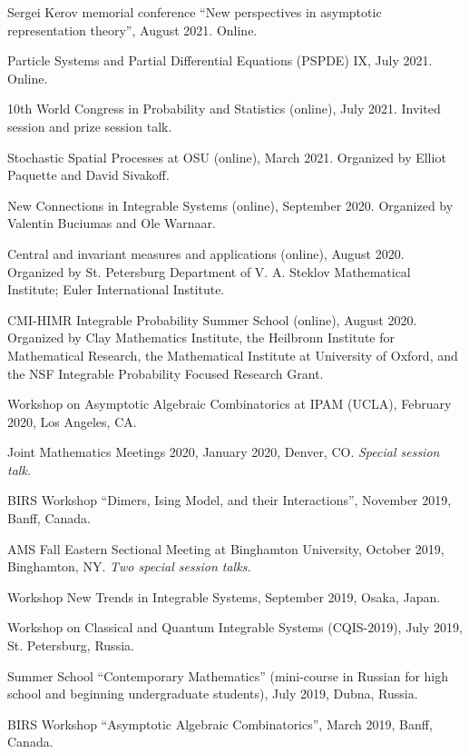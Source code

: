 \documentclass[letterpaper,11pt]{article}
\begin{document}
\begin{etaremune}
\item
	Sergei Kerov memorial conference
	``New perspectives in asymptotic representation theory'',
	August 2021. Online.
\item 
	Particle Systems and Partial Differential Equations (PSPDE) IX,
	July 2021. Online.
\item 
	10th World Congress in Probability and Statistics (online),
	July 2021.
	Invited session and prize session talk. 
\item
	Stochastic Spatial Processes at OSU (online),
	March 2021. 
	Organized by Elliot Paquette and David Sivakoff.
\item New Connections in Integrable Systems (online),
	September 2020. 
	Organized by Valentin Buciumas and Ole Warnaar.
\item
	Central and invariant measures and applications (online),
	August 2020.
	Organized by St. Petersburg Department of V. A. Steklov Mathematical Institute; Euler International Institute.
\item
	CMI-HIMR Integrable Probability Summer School (online),
	August 2020.
	Organized by 
	Clay Mathematics Institute, the Heilbronn Institute for Mathematical Research, 
	the Mathematical Institute at University of Oxford, 
	and the NSF Integrable Probability Focused Research Grant.
\item
	Workshop on Asymptotic Algebraic Combinatorics at
	IPAM (UCLA), February 2020,
	Los Angeles, CA.
\item Joint Mathematics Meetings 2020,
	January 2020, 
	Denver, CO. 
	\emph{Special session talk.}
	\item
		BIRS Workshop ``Dimers, Ising Model, and their Interactions'',
		November 2019, Banff, Canada.
	\item AMS Fall Eastern Sectional Meeting
	at 
	Binghamton University, 
	October 2019,
	Binghamton, NY.
	\emph{Two special session talks.}
	\item 
		Workshop New Trends in Integrable Systems, 
		September 2019, Osaka, Japan.
	\item 
		Workshop on Classical and Quantum Integrable
		Systems (CQIS-2019), July 2019, St. Petersburg, Russia.
	\item  
		Summer School ``Contemporary Mathematics'' (mini-course in Russian for 
		high school and beginning undergraduate students), 
		July 2019, Dubna, Russia.
	\item
		BIRS Workshop ``Asymptotic Algebraic Combinatorics'',
		March 2019, Banff, Canada.

\end{etaremune}
\end{document}
